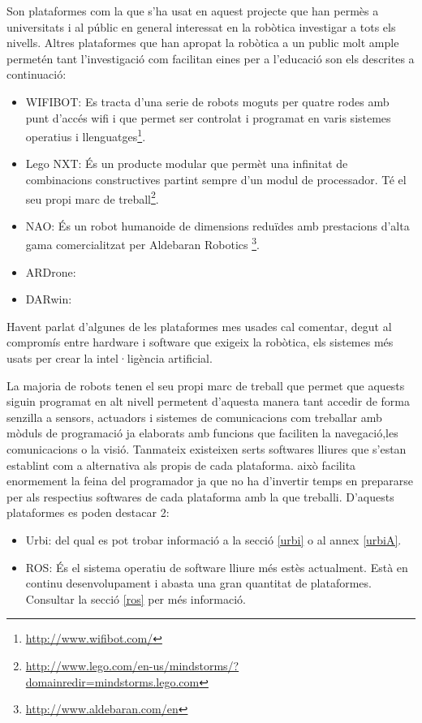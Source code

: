 \documentclass[12pt,a4paper,final,twoside]{article}
\begin{document}
Son plataformes com la que s'ha usat en aquest projecte que han permès a universitats i al públic en general interessat en la robòtica investigar a tots els nivells. Altres plataformes que han apropat la robòtica a un public molt ample permetén tant l'investigació com facilitan eines per a l'educació son els descrites a continuació:

\begin{itemize}
\item WIFIBOT: Es tracta d'una serie de robots moguts per quatre rodes amb punt d'accés wifi i que permet ser controlat i programat en varis sistemes operatius i llenguatges\footnote{\url{http://www.wifibot.com/}}.
\item Lego NXT: És un producte modular que permèt una infinitat de combinacions constructives partint sempre d'un modul de processador. Té el seu propi marc de treball\footnote{\url{http://www.lego.com/en-us/mindstorms/?domainredir=mindstorms.lego.com}}.
\item NAO: És un robot humanoide de dimensions reduïdes amb prestacions d'alta gama comercialitzat per Aldebaran Robotics \footnote{\url{http://www.aldebaran.com/en}}.
\item ARDrone:
\item DARwin:


\end{itemize}

Havent parlat d'algunes de les plataformes mes usades cal comentar, degut al compromís entre hardware i software que exigeix la robòtica, els sistemes més usats per crear la intel·ligència artificial.

La majoria de robots tenen el seu propi marc de treball que permet que aquests siguin programat en alt nivell permetent d'aquesta manera tant accedir de forma senzilla a sensors, actuadors i sistemes de comunicacions com treballar amb mòduls de programació ja elaborats amb funcions que faciliten la navegació,les comunicacions o la visió.
Tanmateix existeixen serts softwares lliures que s'estan establint com a alternativa als propis de cada plataforma. això facilita enormement la feina del programador ja que no ha d'invertir temps en prepararse per als respectius softwares de cada plataforma amb la que treballi.
D'aquests plataformes es poden destacar 2:
\begin{itemize}
\item Urbi: del qual es pot trobar informació a la secció \ref{urbi} o al annex \ref{urbiA}.
\item ROS: És el sistema operatiu de software lliure més estès actualment. Està en continu desenvolupament i abasta una gran quantitat de plataformes. Consultar la secció \ref{ros} per més informació.
\end{itemize} 
\end{document}
